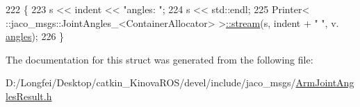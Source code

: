 \begin{DoxyCode}
222   \{
223     s << indent << \textcolor{stringliteral}{"angles: "};
224     s << std::endl;
225     Printer< ::jaco\_msgs::JointAngles\_<ContainerAllocator> >\hyperlink{structros_1_1message__operations_1_1Printer_3_01_1_1jaco__msgs_1_1ArmJointAnglesResult___3_01ContainerAllocator_01_4_01_4_aadb7e34a58cc22b6301489d2e6661bad}{::stream}(s, indent + \textcolor{stringliteral}{"  "}, v.
      \hyperlink{structjaco__msgs_1_1ArmJointAnglesResult___a5b6fe64a0d822194474af38863a9f8a2}{angles});
226   \}
\end{DoxyCode}


The documentation for this struct was generated from the following file\+:\begin{DoxyCompactItemize}
\item 
D\+:/\+Longfei/\+Desktop/catkin\+\_\+\+Kinova\+R\+O\+S/devel/include/jaco\+\_\+msgs/\hyperlink{ArmJointAnglesResult_8h}{Arm\+Joint\+Angles\+Result.\+h}\end{DoxyCompactItemize}
